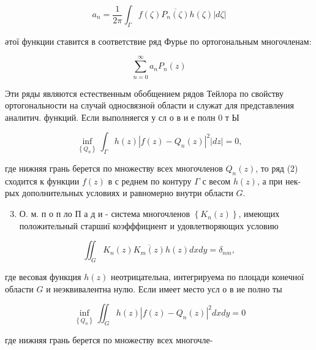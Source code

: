 \documentclass[10pt]{article}
\begin{document}
\[

a_{n}=\frac{1}{2 \pi} \int_{\Gamma} f(\zeta) \overline{P_{n}(\zeta)} h(\zeta)|d \zeta|

\]



әтої функции ставится в соответствие ряд Фурье по ортогональным многочленам:



\[

\sum_{n=0}^{\infty} a_{n} P_{n}(z)

\]



Эти ряды являются естественным обобщением рядов Тейлора по свойству ортогональности на случай односвязноӥ области и служат для представления аналитич. функций. Если выполняегся у сл о в и е полн 0 т Ы



\[

\inf _{\left\{Q_{n}\right\}} \int_{\Gamma} h(z)\left|f(z)-Q_{n}(z)\right|^{2}|d z|=0,

\]



где нижняя грань берется по множеству всех многочленов $Q_{n}(z)$, то ряд (2) сходится к функции $f(z)$ в с реднем по контуру $\Gamma$ с весом $h(z)$, а при нек-рых дополнительных условиях и равномерно внутри области $G$.



\begin{enumerate}

  \setcounter{enumi}{2}

  \item О. м. п о п ло П а д и - система многочленов $\left\{K_{n}(z)\right\}$, имеющих положительный старшиї коэфффициент и удовлетворяющих условию

\end{enumerate}



\[

\iint_{G} K_{n}(z) \overline{K_{m}(z)} h(z) d x d y=\delta_{n m},

\]



где весовая функция $h(z)$ неотрицательна, интегрируема по плоцади конечної области $G$ и неэквивалентна нулю. Если имеет место усл о в ие полно ты



\[

\inf _{\left\{Q_{n}\right\}} \iint_{G} h(z)\left|f(z)-Q_{n}(z)\right|^{2} d x d y=0

\]



где нижняя грань берется по множеству всех многочле-
\end{document}
